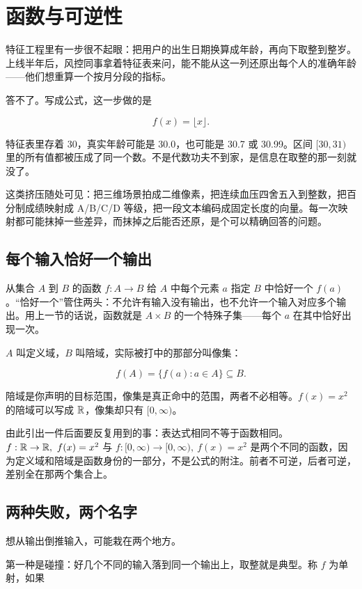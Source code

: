 \section{函数与可逆性}
\label{sec:01-Mathematical-Language/02-Sets-Relations-Functions/04}

特征工程里有一步很不起眼：把用户的出生日期换算成年龄，再向下取整到整岁。上线半年后，风控同事拿着特征表来问，能不能从这一列还原出每个人的准确年龄——他们想重算一个按月分段的指标。

答不了。写成公式，这一步做的是

\[
f(x)=\lfloor x\rfloor.
\]

特征表里存着 30，真实年龄可能是 30.0，也可能是 30.7 或 30.99。区间 \([30,31)\) 里的所有值都被压成了同一个数。不是代数功夫不到家，是信息在取整的那一刻就没了。

这类挤压随处可见：把三维场景拍成二维像素，把连续血压四舍五入到整数，把百分制成绩映射成 A/B/C/D 等级，把一段文本编码成固定长度的向量。每一次映射都可能抹掉一些差异，而抹掉之后能否还原，是个可以精确回答的问题。

\subsection{每个输入恰好一个输出}

从集合 \(A\) 到 \(B\) 的函数 \(f:A\to B\) 给 \(A\) 中每个元素 \(a\) 指定 \(B\) 中恰好一个 \(f(a)\)。``恰好一个''管住两头：不允许有输入没有输出，也不允许一个输入对应多个输出。用上一节的话说，函数就是 \(A\times B\) 的一个特殊子集——每个 \(a\) 在其中恰好出现一次。

\(A\) 叫定义域，\(B\) 叫陪域，实际被打中的那部分叫像集：

\[
f(A)=\{f(a):a\in A\}\subseteq B.
\]

陪域是你声明的目标范围，像集是真正命中的范围，两者不必相等。\(f(x)=x^{2}\) 的陪域可以写成 \(\mathbb{R}\)，像集却只有 \([0,\infty)\)。

由此引出一件后面要反复用到的事：表达式相同不等于函数相同。\(f:\mathbb{R}\to\mathbb{R},\ f(x)=x^{2}\) 与 \(f:[0,\infty)\to[0,\infty),\ f(x)=x^{2}\) 是两个不同的函数，因为定义域和陪域是函数身份的一部分，不是公式的附注。前者不可逆，后者可逆，差别全在那两个集合上。

\subsection{两种失败，两个名字}

想从输出倒推输入，可能栽在两个地方。

第一种是碰撞：好几个不同的输入落到同一个输出上，取整就是典型。称 \(f\) 为单射，如果

